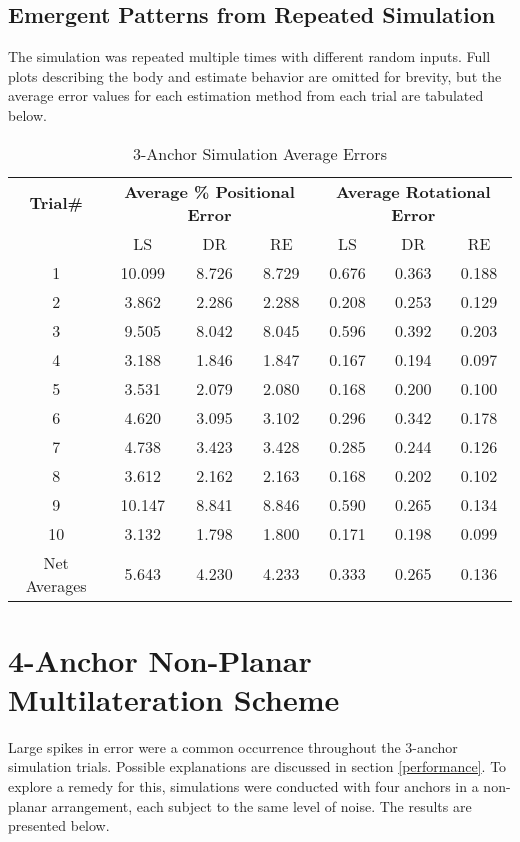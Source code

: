 \documentclass{report}
\begin{document}
			\subsection{Emergent Patterns from Repeated Simulation}
				The simulation was repeated multiple times with different random inputs. Full plots describing the body and estimate behavior are omitted for brevity, but the average error values for each estimation method from each trial are tabulated below.
				\begin{table}[H]
					\centering
					\label{tab:3a}
					\caption{3-Anchor Simulation Average Errors}
					\begin{tabular}{c c c c c c c}\toprule
						\textbf{Trial\#} & \multicolumn{3}{c}{\textbf{Average \% Positional Error}} & \multicolumn{3}{c}{\textbf{Average Rotational Error}} \\
						 & LS & DR & RE & LS & DR & RE \\\midrule
						1 & 10.099 & 8.726 & 8.729 & 0.676 & 0.363 & 0.188 \\
						2 & 3.862 & 2.286 & 2.288 & 0.208 & 0.253 & 0.129 \\
						3 & 9.505 & 8.042 & 8.045 & 0.596 & 0.392 & 0.203 \\
						4 & 3.188 & 1.846 & 1.847 & 0.167 & 0.194 & 0.097 \\
						5 & 3.531 & 2.079 & 2.080 & 0.168 & 0.200 & 0.100 \\
						6 & 4.620 & 3.095 & 3.102 & 0.296 & 0.342 & 0.178 \\
						7 & 4.738 & 3.423 & 3.428 & 0.285 & 0.244 & 0.126 \\
						8 & 3.612 & 2.162 & 2.163 & 0.168 & 0.202 & 0.102 \\
						9 & 10.147 & 8.841 & 8.846 & 0.590 & 0.265 & 0.134 \\
						10 & 3.132 & 1.798 & 1.800 & 0.171 & 0.198 & 0.099 \\\midrule
						Net Averages & 5.643 & 4.230 & 4.233 & 0.333 & 0.265 & 0.136 \\\bottomrule
					\end{tabular}
				\end{table}
				
\newpage
				
		\section{4-Anchor Non-Planar Multilateration Scheme}
			Large spikes in error were a common occurrence throughout the 3-anchor simulation trials. Possible explanations are discussed in section \ref{performance}. To explore a remedy for this, simulations were conducted with four anchors in a non-planar arrangement, each subject to the same level of noise. The results are presented below.
\end{document}
